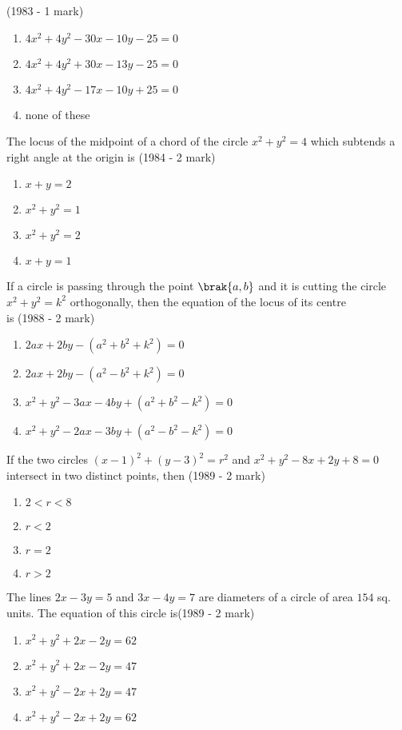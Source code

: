     \hfill {(1983 - 1 mark)}
    \begin{enumerate}
    	\item $4x^{2}+4y^{2}-30x-10y-25=0$
    	\item $4x^{2}+4y^{2}+30x-13y-25=0$
    	\item $4x^{2}+4y^{2}-17x-10y+25=0$
    	\item none of these
    \end{enumerate}
    \item The locus of the midpoint of a chord of the circle $x^{2}+y^{2}=4$ which subtends a right angle at the origin is \hfill {(1984 - 2 mark)}
    \begin{enumerate}
    	\item $x+y=2$
    	\item $x^{2}+y^{2}=1$
    	\item $x^{2}+y^{2}=2$
    	\item $x+y=1$
    \end{enumerate}
    \item If a circle is passing through the point $\brak{a,b}$ and it is cutting the circle $x^{2}+y^{2}=k^{2}$ orthogonally, then the equation of the locus of its centre \\ is 
    \hfill {(1988 - 2 mark)}
    \begin{enumerate}
    	\item $2ax + 2by - (a^{2}+b^{2}+k^{2}) = 0$
    	\item $2ax + 2by - (a^{2}-b^{2}+k^{2}) = 0$
    	\item $x^{2} + y^{2}-3ax-4by+ (a^{2}+b^{2}-k^{2}) = 0$
    	\item $x^{2} + y^{2}-2ax-3by+ (a^{2}-b^{2}-k^{2}) = 0$
    \end{enumerate}
    \item If the two circles $(x-1)^{2} + (y-3)^{2} = r^{2}$ and $x^{2}+y^{2}-8x+2y+8=0$ intersect in two distinct points, then \hfill {(1989 - 2 mark)} 
    \begin{enumerate}
    	\item $2<r<8$
    	\item $r<2$
    	\item $r=2$
    	\item $r>2$
    \end{enumerate}
    \item The lines $2x-3y=5$ and $3x-4y=7$ are diameters of a circle of area $154$ sq. units. The equation of this circle is\hfill {(1989 - 2 mark)}
    \begin{enumerate}
    	\item $x^{2}+y^{2}+2x-2y=62$
    	\item $x^{2}+y^{2}+2x-2y=47$
    	\item $x^{2}+y^{2}-2x+2y=47$
    	\item $x^{2}+y^{2}-2x+2y=62$
    \end{enumerate}
